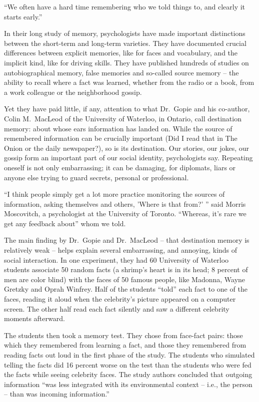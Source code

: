 ﻿\documentclass[12pt]{article}
\begin{document}
``We often have a hard time remembering who we told things to, and clearly it starts early.''

In their long study of memory, psychologists have made important distinctions between the short-term
and long-term varieties. They have documented crucial differences between explicit memories, like
for faces and vocabulary, and the implicit kind, like for driving skills. They have published
hundreds of studies on autobiographical memory, false memories and so-called source memory -- the
ability to recall where a fact was learned, whether from the radio or a book, from a work colleague
or the neighborhood gossip.

Yet they have paid little, if any, attention to what Dr.~Gopie and his co-author, Colin M.~MacLeod
of the University of Waterloo, in Ontario, call destination memory: about whose ears information has
landed on. While the source of remembered information can be crucially important (Did I read that in
The Onion or the daily newspaper?), so is its destination. Our stories, our jokes, our gossip form
an important part of our social identity, psychologists say. Repeating oneself is not only
embarrassing; it can be damaging, for diplomats, liars or anyone else trying to guard secrets,
personal or professional.

``I think people simply get a lot more practice monitoring the sources of information, asking
themselves and others, 'Where is that from?' '' said Morris Moscovitch, a psychologist at the
University of Toronto. ``Whereas, it's rare we get any feedback about'' whom we told.

The main finding by Dr.~Gopie and Dr.~MacLeod -- that destination memory is relatively weak -- helps
explain several embarrassing, and annoying, kinds of social interaction. In one experiment, they had
60 University of Waterloo students associate 50 random facts (a shrimp's heart is in its head; 8
percent of men are color blind) with the faces of 50 famous people, like Madonna, Wayne Gretzky and
Oprah Winfrey. Half of the students ``told'' each fact to one of the faces, reading it aloud when
the celebrity's picture appeared on a computer screen. The other half read each fact silently and
saw a different celebrity moments afterward.

The students then took a memory test. They chose from face-fact pairs: those which they remembered
from learning a fact, and those they remembered from reading facts out loud in the first phase of
the study. The students who simulated telling the facts did 16 percent worse on the test than the
students who were fed the facts while seeing celebrity faces. The study authors concluded that
outgoing information ``was less integrated with its environmental context -- i.e., the person --
than was incoming information.''
\end{document}
